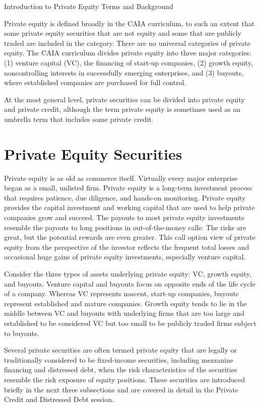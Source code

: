 \documentclass[11pt]{article}
\begin{document}
Introduction to Private Equity Terms and Background

Private equity is defined broadly in the CAIA curriculum, to such an extent that some private equity securities that are not equity and some that are publicly traded are included in the category. There are no universal categories of private equity. The CAIA curriculum divides private equity into three major categories: (1) venture capital (VC), the financing of start-up companies, (2) growth equity, noncontrolling interests in successfully emerging enterprises, and (3) buyouts, where established companies are purchased for full control.

At the most general level, private securities can be divided into private equity and private credit, although the term private equity is sometimes used as an umbrella term that includes some private credit.

\section*{Private Equity Securities}
Private equity is as old as commerce itself. Virtually every major enterprise began as a small, unlisted firm. Private equity is a long-term investment process that requires patience, due diligence, and hands-on monitoring. Private equity provides the capital investment and working capital that are used to help private companies grow and succeed. The payouts to most private equity investments resemble the payouts to long positions in out-of-the-money calls: The risks are great, but the potential rewards are even greater. This call option view of private equity from the perspective of the investor reflects the frequent total losses and occasional huge gains of private equity investments, especially venture capital.

Consider the three types of assets underlying private equity: $\mathrm{VC}$, growth equity, and buyouts. Venture capital and buyouts focus on opposite ends of the life cycle of a company. Whereas VC represents nascent, start-up companies, buyouts represent established and mature companies. Growth equity tends to lie in the middle between VC and buyouts with underlying firms that are too large and established to be considered VC but too small to be publicly traded firms subject to buyouts.

Several private securities are often termed private equity that are legally or traditionally considered to be fixed-income securities, including mezzanine financing and distressed debt, when the risk characteristics of the securities resemble the risk exposure of equity positions. These securities are introduced briefly in the next three subsections and are covered in detail in the Private Credit and Distressed Debt session.
\end{document}

